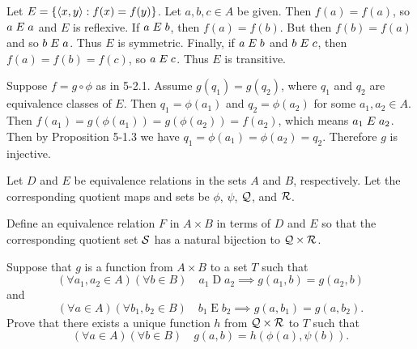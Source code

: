 \begin{solution}
Let $E=\left\{ \left\langle x,y\right\rangle : f(x)=f(y) \right\}$. Let $a,b,c\in A$ be given. Then $f(a)=f(a)$, so $a\mathrel{E} a$ and $E$
is reflexive.
If $a\mathrel{E} b$, then $f(a)=f(b)$. But then $f(b)=f(a)$ and so $b\mathrel{E} a$. Thus $E$ is symmetric.
Finally, if $a\mathrel{E} b$ and $b\mathrel{E} c$, then $f(a)=f(b)=f(c)$, so $a\mathrel{E} c$. Thus $E$ is transitive.

Suppose $f=g\circ \phi$ as in 5-2.1. Assume $g(q_1)=g(q_2)$, where $q_1$ and $q_2$ are equivalence
classes of $E$. Then $q_1=\phi(a_1)$ and $q_2=\phi(a_2)$ for some $a_1,a_2\in A$.
Then $f(a_1)=g(\phi(a_1))=g(\phi(a_2))=f(a_2)$, which means $a_1\mathrel{E} a_2$.
Then by Proposition 5-1.3 we have $q_1=\phi(a_1)=\phi(a_2)=q_2$. Therefore $g$ is injective.
\end{solution}

\begin{exercise}
Let $D$ and $E$ be equivalence relations in the sets $A$ and $B$, respectively.
Let the corresponding quotient maps and sets be $\phi$, $\psi$, $\mathcal{Q}$, and $\mathcal{R}$.
\begin{enumalpha}
    \item Define an equivalence relation $F$ in $A\times B$ in terms of $D$ and $E$ so
        that the corresponding quotient set $\mathcal{S}$ has a natural bijection to $\mathcal{Q}\times\mathcal{R}$.
    \item Suppose that $g$ is a function from $A\times B$ to a set $T$ such that
        \[(\forall a_1,a_2\in A)(\forall b\in B)\quad a_1\mathrel{D} a_2\implies g(a_1,b)=g(a_2,b)\]
        and
        \[(\forall a\in A)(\forall b_1,b_2\in B)\quad b_1\mathrel E b_2\implies g(a,b_1)=g(a,b_2).\]
        Prove that there exists a unique function $h$ from $\mathcal{Q}\times \mathcal{R}$ to $T$ such that
        \[(\forall a\in A)(\forall b\in B)\quad g(a,b)=h(\phi(a),\psi(b)).\]
\end{enumalpha}
\end{exercise}

